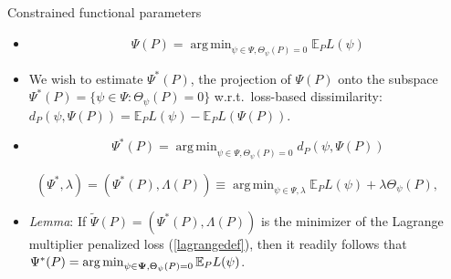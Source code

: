 \documentclass[12pt,t]{beamer}
\newcommand{\E}{\mathbb{E}}
\DeclareMathOperator*{\argmin}{arg\,min}
\begin{document}
\begin{frame}[c]{Constrained functional parameters}

\begin{center}
\begin{itemize}
  \itemsep12pt
  \item $$\Psi(P) = \argmin_{\psi \in \Psi, \Theta_{\psi}(P) = 0} \E_PL(\psi)$$
  \item We wish to estimate $\Psi^*(P)$, the projection of $\Psi(P)$ onto the
    subspace $\Psi^*(P) = \{\psi \in \Psi: \Theta_{\psi}(P) = 0\}$
    w.r.t.~loss-based dissimilarity: $d_{P}(\psi, \Psi(P)) = \E_PL(\psi) -
    \E_PL(\Psi(P))$.
  \item $$ \Psi^*(P) = \argmin_{\psi \in \Psi, \Theta_{\psi}(P) = 0} d_{P}(\psi,
    \Psi(P))$$
\end{itemize}

\begin{equation}\label{lagrangedef}
  (\Psi^*, \lambda) = (\Psi^*(P), \Lambda(P)) \equiv \argmin_{\psi \in \Psi,
    \lambda} \E_PL(\psi) + \lambda \Theta_{\psi}(P),
\end{equation}

\begin{itemize}
  \item \textit{Lemma}: If $\widetilde{\Psi}(P) = (\Psi^*(P), \Lambda(P))$ is
    the minimizer of the Lagrange multiplier penalized loss (\ref{lagrangedef}),
    then it readily follows that $\Psi^*(P) = \argmin_{\psi \in {\bf \Psi},
      \Theta_{\psi}(P) = 0} \E_{P}L(\psi)$.
\end{itemize}

\end{center}

\note{
}

\end{frame}

\end{document}
